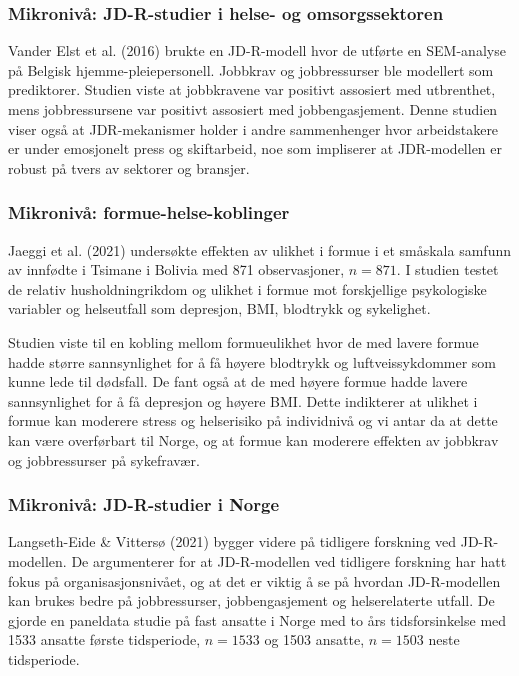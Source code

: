 \documentclass[
  12pt,
  a4paper,
  DIV=11,
  numbers=noendperiod]{scrartcl}
\begin{document}
\subsubsection{Mikronivå: JD-R-studier i helse- og
omsorgssektoren}\label{mikronivuxe5-jd-r-studier-i-helse--og-omsorgssektoren}

Vander Elst et al. (2016) brukte en JD-R-modell hvor de utførte en
SEM-analyse på Belgisk hjemme-pleiepersonell. Jobbkrav og jobbressurser
ble modellert som prediktorer. Studien viste at jobbkravene var positivt
assosiert med utbrenthet, mens jobbressursene var positivt assosiert med
jobbengasjement. Denne studien viser også at JDR-mekanismer holder i
andre sammenhenger hvor arbeidstakere er under emosjonelt press og
skiftarbeid, noe som impliserer at JDR-modellen er robust på tvers av
sektorer og bransjer.

\subsubsection{Mikronivå:
formue-helse-koblinger}\label{mikronivuxe5-formue-helse-koblinger}

Jaeggi et al. (2021) undersøkte effekten av ulikhet i formue i et
småskala samfunn av innfødte i Tsimane i Bolivia med 871 observasjoner,
\(n = 871\). I studien testet de relativ husholdningrikdom og ulikhet i
formue mot forskjellige psykologiske variabler og helseutfall som
depresjon, BMI, blodtrykk og sykelighet.

Studien viste til en kobling mellom formueulikhet hvor de med lavere
formue hadde større sannsynlighet for å få høyere blodtrykk og
luftveissykdommer som kunne lede til dødsfall. De fant også at de med
høyere formue hadde lavere sannsynlighet for å få depresjon og høyere
BMI. Dette indikterer at ulikhet i formue kan moderere stress og
helserisiko på individnivå og vi antar da at dette kan være overførbart
til Norge, og at formue kan moderere effekten av jobbkrav og
jobbressurser på sykefravær.

\subsubsection{Mikronivå: JD-R-studier i
Norge}\label{mikronivuxe5-jd-r-studier-i-norge}

Langseth-Eide \& Vittersø (2021) bygger videre på tidligere forskning
ved JD-R-modellen. De argumenterer for at JD-R-modellen ved tidligere
forskning har hatt fokus på organisasjonsnivået, og at det er viktig å
se på hvordan JD-R-modellen kan brukes bedre på jobbressurser,
jobbengasjement og helserelaterte utfall. De gjorde en paneldata studie
på fast ansatte i Norge med to års tidsforsinkelse med 1533 ansatte
første tidsperiode, \(n =1533\) og 1503 ansatte, \(n = 1503\) neste
tidsperiode.
\end{document}
